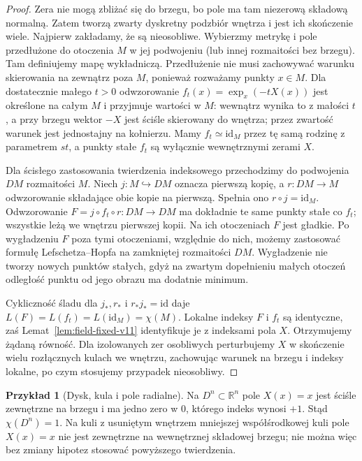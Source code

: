 \documentclass[11pt,a4paper,oneside]{report}
\newcommand{\R}{\mathbb{R}}
\newcommand{\id}{\mathrm{id}}
\theoremstyle{plain}
\theoremstyle{definition}
\newtheorem{przyklad}[twierdzenie]{Przykład}
\theoremstyle{remark}
\begin{document}
\begin{proof}
Zera nie mogą zbliżać się do brzegu, bo pole ma tam
niezerową składową normalną. Zatem tworzą zwarty dyskretny
podzbiór wnętrza i jest ich skończenie wiele.
Najpierw zakładamy, że są nieosobliwe.
Wybierzmy metrykę i pole przedłużone do otoczenia
$M$ w jej podwojeniu (lub innej rozmaitości bez brzegu).
Tam definiujemy mapę wykładniczą. Przedłużenie nie
musi zachowywać warunku skierowania na zewnątrz
poza $M$, ponieważ rozważamy punkty $x\in M$.
Dla dostatecznie małego $t>0$ odwzorowanie
$f_t(x)=\exp_x(-tX(x))$ jest określone na całym $M$
i przyjmuje wartości w $M$: wewnątrz wynika to z małości
$t$, a przy brzegu wektor $-X$ jest ściśle skierowany
do wnętrza; przez zwartość warunek jest jednostajny
na kołnierzu. Mamy $f_t\simeq\id_M$ przez tę samą
rodzinę z parametrem $st$, a punkty stałe $f_t$ są
wyłącznie wewnętrznymi zerami $X$.

Dla ścisłego zastosowania twierdzenia indeksowego
przechodzimy do podwojenia $DM$ rozmaitości $M$.
Niech $j:M\hookrightarrow DM$ oznacza pierwszą kopię,
a $r:DM\to M$ odwzorowanie składające obie kopie
na pierwszą. Spełnia ono $r\circ j=\id_M$.
Odwzorowanie $F=j\circ f_t\circ r:DM\to DM$ ma dokładnie
te same punkty stałe co $f_t$; wszystkie leżą we wnętrzu
pierwszej kopii. Na ich otoczeniach $F$ jest gładkie.
Po wygładzeniu $F$ poza tymi otoczeniami, względnie do nich,
możemy zastosować formułę Lefschetza--Hopfa na zamkniętej
rozmaitości $DM$. Wygładzenie nie tworzy nowych punktów
stałych, gdyż na zwartym dopełnieniu małych otoczeń
odległość punktu od jego obrazu ma dodatnie minimum.

Cykliczność śladu dla $j_*,r_*$ i $r_*j_*=\id$ daje
$L(F)=L(f_t)=L(\id_M)=\chi(M)$.
Lokalne indeksy $F$ i $f_t$ są identyczne, zaś
Lemat~\ref{lem:field-fixed-v11} identyfikuje je z indeksami
pola $X$. Otrzymujemy żądaną równość.
Dla izolowanych zer osobliwych perturbujemy $X$ w
skończenie wielu rozłącznych kulach we wnętrzu,
zachowując warunek na brzegu i indeksy lokalne,
po czym stosujemy przypadek nieosobliwy.
\end{proof}

\begin{przyklad}[Dysk, kula i pole radialne]
Na $D^n\subset\R^n$ pole $X(x)=x$ jest ściśle zewnętrzne
na brzegu i ma jedno zero w $0$, którego indeks wynosi $+1$.
Stąd $\chi(D^n)=1$. Na kuli z usuniętym wnętrzem mniejszej
współśrodkowej kuli pole $X(x)=x$ nie jest zewnętrzne
na wewnętrznej składowej brzegu; nie można więc bez
zmiany hipotez stosować powyższego twierdzenia.
\end{przyklad}
\end{document}
